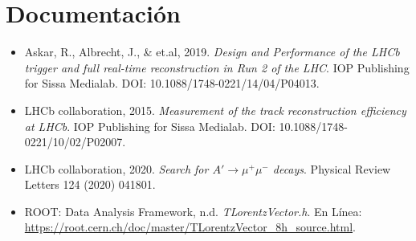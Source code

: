 \section{Documentación}
\begin{itemize}
    \item Askar, R., Albrecht, J., \& et.al, 2019. \textit{Design and Performance of the LHCb trigger and full real-time reconstruction in Run 2 of the LHC}. IOP Publishing for Sissa Medialab. DOI: 10.1088/1748-0221/14/04/P04013.
    \item LHCb collaboration, 2015. \textit{Measurement of the track reconstruction efficiency at LHCb}. IOP Publishing for Sissa Medialab. DOI: 10.1088/1748-0221/10/02/P02007.
    \item LHCb collaboration, 2020. \textit{Search for $A'\to\mu^{+}\mu^{-}$ decays}. Physical Review Letters 124 (2020) 041801.
    \item ROOT: Data Analysis Framework, n.d. \textit{TLorentzVector.h}. En Línea: \url{https://root.cern.ch/doc/master/TLorentzVector_8h_source.html}.
\end{itemize}

